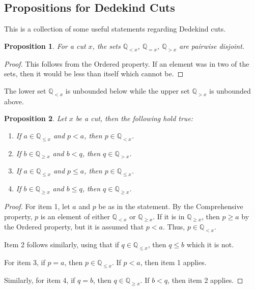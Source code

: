 \documentclass[12pt]{article}
\newtheorem{proposition}{Proposition}[section]
\newcommand{\qcut}[2][x]{\ensuremath{\mathbb{Q}_{#2 #1}}}
\newcommand{\qlt}[1][x]{\qcut[#1]{<}}
\newcommand{\qeq}[1][x]{\qcut[#1]{=}}
\newcommand{\qgt}[1][x]{\qcut[#1]{>}}
\newcommand{\qgeq}[1][x]{\qcut[#1]{\geq}}
\newcommand{\qleq}[1][x]{\qcut[#1]{\leq}}
\begin{document}
\subsection{Propositions for Dedekind Cuts}

This is a collection of some useful statements regarding Dedekind cuts. 

\begin{proposition}
    For a cut $x$, the sets $\qlt$, $\qeq$, $\qgt$ are pairwise disjoint. 
\end{proposition}

\begin{proof}
    This follows from the Ordered property. If an element was in two of the sets, then it would be less than itself which cannot be. 
\end{proof}

The lower set $\qlt$ is unbounded below while the upper set $\qgt$ is unbounded above. 

\begin{proposition}\label{br:cut-unbounded}
    Let $x$ be a cut, then the following hold true:
    \begin{enumerate}
        \item If $a \in \qleq$ and $p < a$, then $p \in \qlt$. 
        \item If $b \in \qgeq$ and $b < q$, then $q \in \qgt$. 
        \item If $a \in \qleq$ and $p \leq a$, then $p \in \qleq$. 
        \item If $b \in \qgeq$ and $b \leq q$, then $q \in \qgeq$. 
    \end{enumerate}
\end{proposition}

\begin{proof}
    For item 1, let $a$ and $p$ be as in the statement. By the Comprehensive property, $p$ is an element of either $\qlt$ or $\qgeq$. If it is in $\qgeq$, then $p \geq a$ by the Ordered property, but it is assumed that $p < a$. Thus, $p \in \qlt$.

    Item 2 follows similarly, using that if $q \in \qleq$, then $q \leq b$ which it is not. 

    For item 3, if $p = a$, then $p \in \qleq$. If $p < a$, then item 1 applies. 

    Similarly, for item 4, if $q = b$, then $q \in \qgeq$. If $b < q$, then item 2 applies. 

\end{proof}
\end{document}
